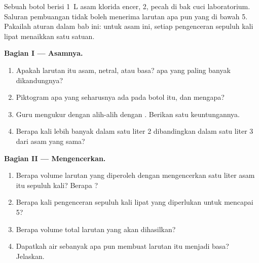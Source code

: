 \begin{problem}
\label{pb:g9:acids-bases-ph:1}
Sebuah botol berisi \qty{1}{L} asam klorida encer,  2, pecah di bak
cuci laboratorium. Saluran pembuangan tidak boleh menerima larutan apa
pun yang  di bawah 5. Pakailah aturan dalam bab ini: untuk asam
ini, setiap pengenceran sepuluh kali lipat menaikkan  satu satuan.

\medskip
\noindent\textbf{Bagian I --- Asamnya.}
\begin{enumerate}
  \item Apakah larutan itu asam, netral, atau basa?  apa yang paling
        banyak dikandungnya?
  \item Piktogram apa yang seharusnya ada pada botol itu, dan mengapa?
  \item Guru mengukur  dengan  alih-alih dengan .
        Berikan satu keuntungannya.
  \item Berapa kali lebih banyak   dalam satu liter  2
        dibandingkan dalam satu liter  3 dari asam yang sama?
\end{enumerate}

\medskip
\noindent\textbf{Bagian II --- Mengencerkan.}
\begin{enumerate}[resume]
  \item Berapa volume larutan yang diperoleh dengan mengencerkan satu
        liter asam itu sepuluh kali? Berapa ?
  \item Berapa kali pengenceran sepuluh kali lipat yang diperlukan untuk
        mencapai  5?
  \item Berapa volume total larutan yang akan dihasilkan?
  \item Dapatkah air sebanyak apa pun membuat larutan itu menjadi basa?
        Jelaskan.
\end{enumerate}


\end{problem}
